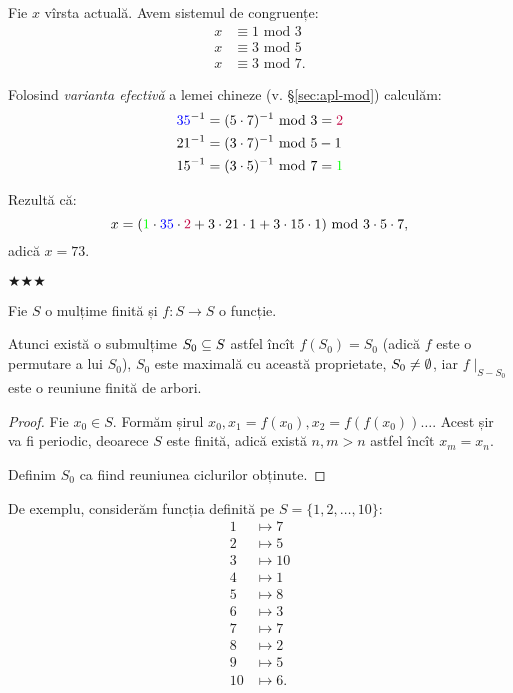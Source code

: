 Fie $ x $ vîrsta actuală. Avem sistemul de congruențe:
\begin{align*}
  x &\equiv 1 \text{ mod } 3 \\
  x &\equiv 3 \text{ mod } 5 \\
  x &\equiv 3 \text{ mod } 7.
\end{align*}

Folosind \emph{varianta efectivă} a lemei chineze (v. \S \ref{sec:apl-mod}) calculăm:
\begin{align*}
  {\color{blue} 35}^{-1} &= (5 \cdot 7)^{-1} \text{ mod } 3 = {\color{purple} 2} \\
  21^{-1} &= (3 \cdot 7)^{-1} \text{ mod } 5 - 1 \\
  15^{-1} &= (3 \cdot 5)^{-1} \text{ mod } 7 = {\color{green} 1}           
\end{align*}

Rezultă că:
\[
  x = ({\color{green} 1} \cdot {\color{blue} 35} \cdot {\color{purple} 2} +%
  3 \cdot 21 \cdot 1 + 3 \cdot 15 \cdot 1) \text{ mod } 3 \cdot 5 \cdot 7,
\]
adică $ x = 73 $.

\begin{center}
  {\large $\bigstar\bigstar\bigstar$}
\end{center}

\begin{theorem}\label{thm:functie-arbori}
  Fie $ S $ o mulțime finită și $ f : S \to S $ o funcție.

  Atunci există o submulțime $ S_0 \subseteq S $ astfel încît $ f(S_0) = S_0 $
  (adică $ f $ este o permutare a lui $ S_0 $), $ S_0 $ este maximală
  cu această proprietate, $ S_0 \neq \emptyset $, iar $ f \mid_{S - S_0} $
  este o reuniune finită de arbori.
\end{theorem}

\begin{proof}
  Fie $ x_0 \in S $. Formăm șirul $ x_0, x_1 = f(x_0), x_2 = f(f(x_0)) \dots $.
  Acest șir va fi periodic, deoarece $ S $ este finită, adică există
  $ n, m > n $ astfel încît $ x_m = x_n $.

  Definim $ S_0 $ ca fiind reuniunea ciclurilor obținute.
\end{proof}

De exemplu, considerăm funcția definită pe $ S = \{ 1, 2, \dots, 10 \} $:
\begin{align*}
  1 &\mapsto 7 \\
  2 &\mapsto 5 \\
  3 &\mapsto 10 \\
  4 &\mapsto 1 \\
  5 &\mapsto 8 \\
  6 &\mapsto 3 \\
  7 &\mapsto 7 \\
  8 &\mapsto 2 \\
  9 &\mapsto 5 \\
  10 & \mapsto 6.
\end{align*}

